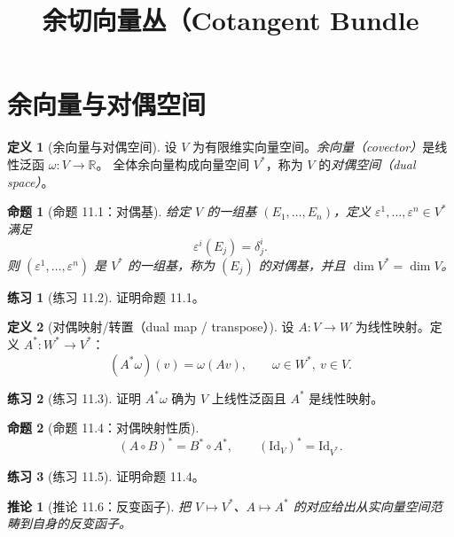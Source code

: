 \documentclass[12pt,a4paper]{article}
\title{余切向量丛（Cotangent Bundle}
\author{}
\date{}
\theoremstyle{definition}
\newtheorem{definition}{定义}[section]
\newtheorem{exercise}{练习}[section]
\theoremstyle{plain}
\newtheorem{proposition}{命题}[section]
\newtheorem{corollary}{推论}[section]
\newcommand{\R}{\mathbb{R}}
\newcommand{\Id}{\mathrm{Id}}
\begin{document}
\maketitle
\tableofcontents

\section{余向量与对偶空间}

\begin{definition}[余向量与对偶空间]
设 $V$ 为有限维实向量空间。\emph{余向量（covector）}是线性泛函 $\omega:V\to\R$。
全体余向量构成向量空间 $V^{*}$，称为 $V$ 的\emph{对偶空间（dual space）}。
\end{definition}

\begin{proposition}[命题 11.1：对偶基]
给定 $V$ 的一组基 $(E_1,\dots,E_n)$，定义 $\varepsilon^1,\dots,\varepsilon^n\in V^*$ 满足
\[
\varepsilon^i(E_j)=\delta^i_j.
\]
则 $(\varepsilon^1,\dots,\varepsilon^n)$ 是 $V^*$ 的一组基，称为 $(E_j)$ 的\emph{对偶基}，并且 $\dim V^*=\dim V$。
\end{proposition}

\begin{exercise}[练习 11.2]
证明命题 11.1。
\end{exercise}

\begin{definition}[对偶映射/转置（dual map / transpose）]
设 $A:V\to W$ 为线性映射。定义 $A^*:W^*\to V^*$：
\[
(A^*\omega)(v)=\omega(Av),\qquad \omega\in W^*,\ v\in V.
\]
\end{definition}

\begin{exercise}[练习 11.3]
证明 $A^*\omega$ 确为 $V$ 上线性泛函且 $A^*$ 是线性映射。
\end{exercise}

\begin{proposition}[命题 11.4：对偶映射性质]
\[
(A\circ B)^* = B^*\circ A^*,\qquad (\Id_V)^*=\Id_{V^*}.
\]
\end{proposition}

\begin{exercise}[练习 11.5]
证明命题 11.4。
\end{exercise}

\begin{corollary}[推论 11.6：反变函子]
把 $V\mapsto V^*$、$A\mapsto A^*$ 的对应给出从实向量空间范畴到自身的\emph{反变函子}。
\end{corollary}
\end{document}
